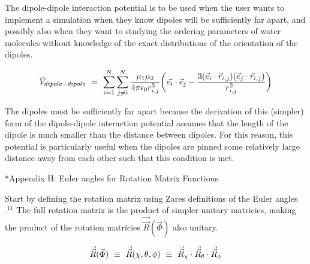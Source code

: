 \documentclass[11pt]{article}
\makeatletter
\let\workreportsection\section
\renewcommand{\section}{\@ifstar{\workreportstarsection}{\workreportsection}}
\newcommand{\workreportstarsection}[1]{\workreportsection*{#1}\addcontentsline{toc}{section}{#1}}
\makeatother
\begin{document}
The dipole-dipole interaction potential is to be used when the user wants to implement a simulation when they know dipoles will be sufficiently far apart, and possibly also when they want to studying the ordering parameters of water molecules without knowledge of the exact distributions of the orientation of the dipoles. 

\begin{equation} \label{wr-eq-69-1}
\hat{V}_{dipole-dipole} \hspace{0.125cm} = \hspace{0.125cm} \sum_{i = 1}^{N} \sum_{j \neq i}^{N} \frac{\mu_{1} \mu_{2}}{4 \pi \epsilon_{0} r_{i, j}^{3}} \bigg( \vec{e_i} \cdot \vec{e}_{j} - \frac{3(\vec{e}_{i} \cdot \vec{r}_{i, j})( \vec{e}_{j} \cdot \vec{r}_{i, j})}{r_{i, j}^{2}} \bigg)
\end{equation}

The dipoles must be sufficiently far apart because the derivation of this (simpler) form of the dipole-dipole interaction potential assumes that the length of the dipole is much smaller than the distance between dipoles. For this reason, this potential is particularly useful when the dipoles are pinned some relatively large distance away from each other such that this condition is met. 

\hypertarget{wr-appendix-h}{}
\section*{Appendix H: Euler angles for Rotation Matrix Functions}
\label{wr-app-eulang-1}

Start by defining the rotation matrix using Zares definitions of the Euler angles \begin{math}.^{11} \end{math} The full rotation matrix is the product of simpler unitary matricies, making the product of the rotation matricies \begin{math} \vec{\vec{R}} ( \vec{\Phi} )  \end{math} also unitary.

\begin{equation}
    \vec{\vec{R}} ( \vec{\Phi} ) \hspace{0.125cm} \equiv \hspace{0.125cm} \vec{\vec{R}} ( \chi , \theta , \phi ) \hspace{0.125cm} \equiv \hspace{0.125cm}  \vec{\vec{R}}_{\chi} \cdot \vec{\vec{R}}_{\theta} \cdot \vec{\vec{R}}_{\phi} 
\end{equation}
\end{document}
